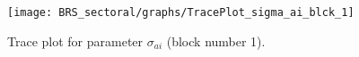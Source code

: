 \begin{figure}[H]
\centering
  \texttt{[image: BRS\_sectoral/graphs/TracePlot\_sigma\_ai\_blck\_1]}\\
    \caption{Trace plot for parameter ${\sigma_{ai}}$ (block number 1).}
\end{figure}
